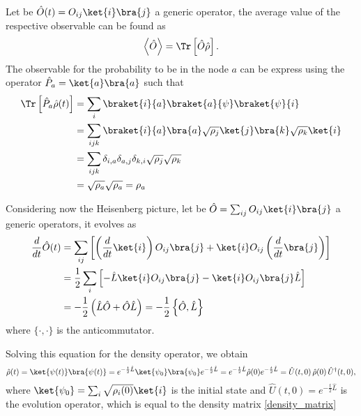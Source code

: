 Let be $\hat O(t) = O_{ij}\ket{i}\bra{j}$ a generic operator, the average value of the respective observable can be found as
\begin{equation}
    \begin{split}
        \left< \hat O\right> &= \Tr\left[\hat O\hat\rho\right]. \\ %
    \end{split}
\end{equation}
The observable for the probability to be in the node $a$ can be express using the operator $\hat P_a = \ket{a}\bra{a}$ such that
\begin{equation} \label{state_projection}
    \begin{split}
        \Tr\left[\hat P_a\hat\rho(t)\right] &= \sum_i \braket{i}{a}\braket{a}{\psi}\braket{\psi}{i}\\
        & = \sum_{ijk} \braket{i}{a}\bra{a}\sqrt{\rho_j}\ket{j}\bra{k}\sqrt{\rho_k}\ket{i}\\
        &= \sum_{ijk} \delta_{i,a}\delta_{a,j}\delta_{k,i}\sqrt{\rho_j}\sqrt{\rho_k}\\
        & = \sqrt{\rho_a}\sqrt{\rho_a} = \rho_a
    \end{split}
\end{equation}

Considering now the Heisenberg picture, let be $\hat O = \sum_{ij} O_{ij} \ket{i}\bra{j}$ a generic operators, it evolves as
\begin{equation}     
    \begin{split}
    \frac{d}{dt} \hat O(t) &= \sum_{ij}\left[\left(\frac{d}{dt}\ket{i}\right)O_{ij}\bra{j} + \ket{i}O_{ij}\left(\frac{d}{dt}\bra{j}\right)\right]\\ 
    &= \frac{1}{2}\sum_i \left[-\hat L \ket{i}O_{ij}\bra{j} -\ket{i}O_{ij}\bra{j}\hat L\right]\\ 
    &= -\frac{1}{2}\left(\hat L \hat O + \hat O \hat L\right) = -\frac{1}{2}\left\{\hat O,\hat L \right\}\\
    \end{split}
\end{equation}
where $\{\cdot, \cdot\}$ is the anticommutator. 

Solving this equation for the density operator, we obtain
\begin{equation}\label{density_matrix_evolution}
    \hat\rho(t) = \ket{\psi(t)}\bra{\psi(t)}= e^{-\frac{t}{2}\hat L} \ket{\psi_0}\bra{\psi_0}e^{-\frac{t}{2}\hat L} = e^{-\frac{t}{2}\hat L}\hat\rho(0)e^{-\frac{t}{2}\hat L}  = \hat U(t,0) \, \hat\rho(0) \,\hat U^\dagger(t,0),
\end{equation}
where $\ket{\psi_0} = \sum_i\sqrt{\rho_i(0)}\ket{i}$ is the initial state and $\hat U(t,0) = e^{-\frac{t}{2}\hat L}$ is the evolution operator, which is equal to the density matrix \eqref{density_matrix}

